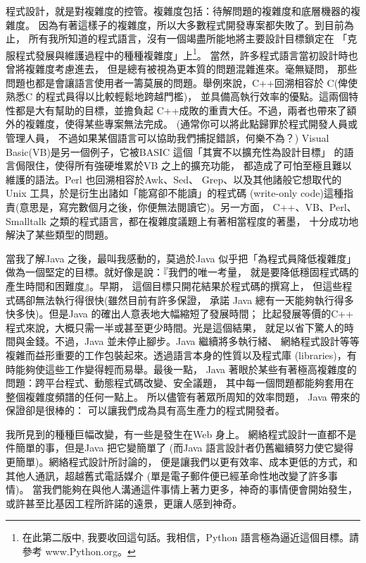 程式設計，就是對複雜度的控管。複雜度包括：待解問題的複雜度和底層機器的複雜度。
因為有著這樣子的複雜度，所以大多數程式開發專案都失敗了。到目前為止，
所有我所知道的程式語言，沒有一個竭盡所能地將主要設計目標鎖定在
「克服程式發展與維護過程中的種種複雜度」上\footnote{在此第二版中,
我要收回這句話。我相信，Python 語言極為逼近這個目標。請參考 www.Python.org。}。
當然，許多程式語言當初設計時也曾將複雜度考慮進去，
但是總有被視為更本質的問題混雜進來。毫無疑問，
那些問題也都是會讓語言使用者一籌莫展的問題。舉例來說，C++回溯相容於
C(俾使熟悉C 的程式員得以比較輕鬆地跨越門檻)，
並具備高執行效率的優點。這兩個特性都是大有幫助的目標，並擔負起
C++成敗的重責大任。不過，兩者也帶來了額外的複雜度，使得某些專案無法完成。
(通常你可以將此點歸罪於程式開發人員或管理人員，
不過如果某個語言可以協助我們捕捉錯誤，何樂不為？)
Visual Basic(VB)是另一個例子，它被BASIC 這個「其實不以擴充性為設計目標」
的語言侷限住，使得所有強硬堆累於VB 之上的擴充功能，
都造成了可怕至極且難以維護的語法。Perl 也回溯相容於Awk、Sed、
Grep、以及其他諸般它想取代的Unix 工具，於是衍生出諸如「能寫卻不能讀」的程式碼
(write-only code)這種指責(意思是，寫完數個月之後，你便無法閱讀它)。另一方面，
C++、VB、Perl、Smalltalk 之類的程式語言，都在複雜度議題上有著相當程度的著墨，
十分成功地解決了某些類型的問題。

當我了解Java 之後，最叫我感動的，莫過於Java 似乎把「為程式員降低複雜度」
做為一個堅定的目標。就好像是說：『我們的唯一考量，
就是要降低穩固程式碼的產生時間和困難度』。早期，
這個目標只開花結果於程式碼的撰寫上，
但這些程式碼卻無法執行得很快(雖然目前有許多保證， 承諾
Java 總有一天能夠執行得多快多快)。但是Java 的確出人意表地大幅縮短了發展時間；
比起發展等價的C++ 程式來說，大概只需一半或甚至更少時間。光是這個結果，
就足以省下驚人的時間與金錢。不過，Java 並未停止腳步。Java 繼續將多執行緒、
網絡程式設計等等複雜而益形重要的工作包裝起來。透過語言本身的性質以及程式庫
(libraries)，有時能夠使這些工作變得輕而易舉。最後一點，
Java 著眼於某些有著極高複雜度的問題：跨平台程式、動態程式碼改變、安全議題，
其中每一個問題都能夠套用在整個複雜度頻譜的任何一點上。
所以儘管有著眾所周知的效率問題， Java 帶來的保證卻是很棒的：
可以讓我們成為具有高生產力的程式開發者。

我所見到的種種巨幅改變，有一些是發生在Web 身上。
網絡程式設計一直都不是件簡單的事，但是Java 把它變簡單了
(而Java 語言設計者仍舊繼續努力使它變得更簡單)。網絡程式設計所討論的，
便是讓我們以更有效率、成本更低的方式，和其他人通訊，超越舊式電話媒介
(單是電子郵件便已經革命性地改變了許多事情)。
當我們能夠在與他人溝通這件事情上著力更多，神奇的事情便會開始發生，
或許甚至比基因工程所許諾的遠景，更讓人感到神奇。

